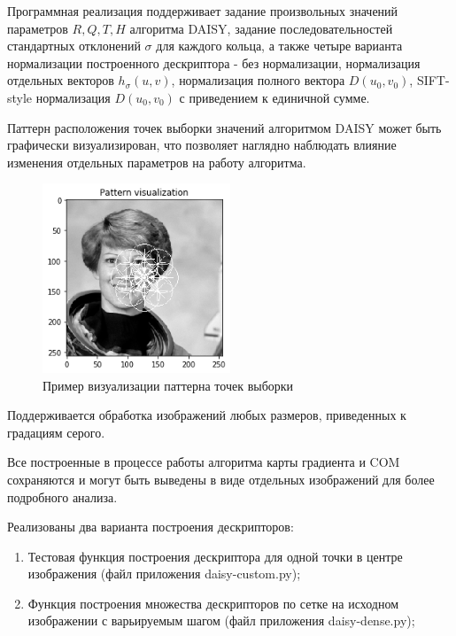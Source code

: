 {{{{{   		Программная реализация поддерживает задание произвольных значений параметров $R, Q, T, H$ алгоритма DAISY, задание последовательностей стандартных отклонений $ \sigma $ для каждого кольца, а также четыре варианта нормализации построенного дескриптора - без нормализации, нормализация отдельных векторов $h_\sigma(u,v)$, нормализация полного вектора $D(u_0,v_0)$, SIFT-style нормализация $D(u_0,v_0)$ с приведением к единичной сумме.
   		
   		Паттерн расположения точек выборки значений алгоритмом DAISY может быть графически визуализирован, что позволяет наглядно наблюдать влияние изменения отдельных параметров на работу алгоритма. 
   		
   		\begin{figure}[H]
   			\centering                             
   			\includegraphics[width=0.5\textwidth,keepaspectratio]{daisy/pattern_vis.png}   
   			\centering\caption{ Пример визуализации паттерна точек выборки }
   			\label{pattern_visualisation}                           
   		\end{figure}    
   		
   		Поддерживается обработка изображений любых размеров, приведенных к градациям серого. 
   		
   		Все построенные в процессе работы алгоритма карты градиента и COM сохраняются и могут быть выведены в виде отдельных изображений для более подробного анализа.
   		
   		Реализованы два варианта построения дескрипторов:
   		\begin{enumerate}
   			\item Тестовая функция построения дескриптора для одной точки в центре изображения (файл приложения daisy-custom.py);
   			\item Функция построения множества дескрипторов по сетке на исходном изображении с варьируемым шагом (файл приложения daisy-dense.py);
   		\end{enumerate}
   	
}}}}}

